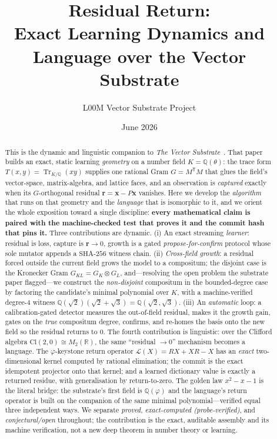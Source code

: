 \documentclass[11pt]{article}
\title{\textbf{Residual Return:\\ Exact Learning Dynamics and Language over the Vector Substrate}}
\author{L00M Vector Substrate Project}
\date{June 2026}
\theoremstyle{plain}
\theoremstyle{definition}
\theoremstyle{remark}
\newcommand{\Q}{\mathbb{Q}}
\newcommand{\R}{\mathbb{R}}
\newcommand{\K}{K}
\newcommand{\Tr}{\operatorname{Tr}}
\newcommand{\rr}{\mathbf{r}}
\newcommand{\xx}{\mathbf{x}}
\newcommand{\GG}{G}
\newcommand{\transpose}{^{\mathsf{T}}}
\newcommand{\Cl}{\mathrm{Cl}}
\newcommand{\Lop}{\mathcal{L}}
\begin{document}
\maketitle

\begin{abstract}
This is the dynamic and linguistic companion to \emph{The Vector Substrate}~\cite{VectorSubstrate}. That
paper builds an exact, static learning \emph{geometry} on a number field $\K=\Q(\theta)$: the trace form
$T(x,y)=\Tr_{\K/\Q}(xy)$ supplies one rational Gram $\GG=M\transpose M$ that glues the field's vector-space,
matrix-algebra, and lattice faces, and an observation is \emph{captured} exactly when its $\GG$-orthogonal
residual $\rr=\xx-P\xx$ vanishes. Here we develop the \emph{algorithm} that runs on that geometry and the
\emph{language} that is isomorphic to it, and we orient the whole exposition toward a single discipline:
\textbf{every mathematical claim is paired with the machine-checked test that proves it and the commit hash
that pins it.} Three contributions are dynamic. (i) An exact streaming \emph{learner}: residual is loss,
capture is $\rr\to0$, growth is a gated \emph{propose-for-confirm} protocol whose sole mutator appends a
$\mathrm{SHA}\text{-}256$ witness chain. (ii) \emph{Cross-field growth}: a residual forced outside the
current field grows the model to a compositum; the disjoint case is the Kronecker Gram
$\GG_{\K L}=\GG_\K\otimes\GG_L$, and---resolving the open problem the substrate paper flagged---we construct
the \emph{non-disjoint} compositum in the bounded-degree case by factoring the candidate's minimal polynomial
over $\K$, with a machine-verified degree-$4$ witness $\Q(\sqrt2)(\sqrt2+\sqrt3)=\Q(\sqrt2,\sqrt3)$. (iii) An
\emph{automatic} loop: a calibration-gated detector measures the out-of-field residual, makes it the growth
gain, gates on the \emph{true} compositum degree, confirms, and re-homes the basis onto the new field so the
residual returns to $0$. The fourth contribution is linguistic: over the Clifford algebra
$\Cl(2,0)\cong M_2(\R)$, the same ``residual $\to 0$'' mechanism becomes a language. The $\varphi$-keystone
return operator $\Lop(X)=RX+XR-X$ has an \emph{exact} two-dimensional kernel computed by rational
elimination; the commit is the exact idempotent projector onto that kernel; and a learned dictionary value is
exactly a returned residue, with generalisation by return-to-zero. The golden law $x^2-x-1$ is the literal
bridge: the substrate's first field is $\Q(\varphi)$ and the language's return operator is built on the
companion of the same minimal polynomial---verified equal three independent ways. We separate \emph{proved},
\emph{exact-computed (probe-verified)}, and \emph{conjectural/open} throughout; the contribution is the exact,
auditable assembly and its machine verification, not a new deep theorem in number theory or learning.
\end{abstract}
\end{document}

